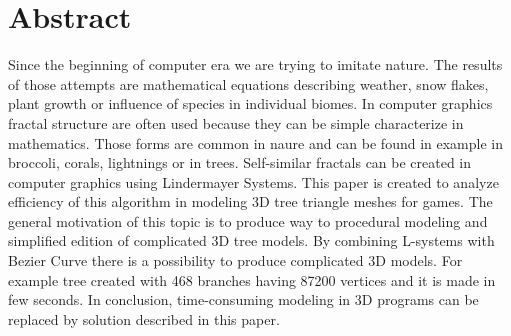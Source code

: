 \documentclass[12pt]{report}
\begin{document}
\begin{sloppypar}
\begin{thebibliography}{99}
\end{thebibliography}

\listoffigures

\lstlistoflistings

\listofmyequations
{} 

\chapter*{Abstract}
Since the beginning of computer era we are trying to imitate nature. The results of those attempts are mathematical equations describing weather, snow flakes, plant growth or influence of species in individual biomes. In computer graphics fractal structure are often used because they can be simple characterize in mathematics. Those forms are common in naure and can be found in example in broccoli, corals, lightnings or in trees. 
Self-similar fractals can be created in computer graphics using Lindermayer Systems. This paper is created to analyze efficiency of this algorithm in modeling 3D tree triangle meshes for games. The general motivation of this topic is to produce way to procedural modeling and simplified edition of complicated 3D tree models. By combining L-systems with Bezier Curve there is a possibility to produce complicated 3D models. For example tree created with 468 branches having 87200 vertices and it is made in few seconds. In conclusion, time-consuming modeling in 3D programs can be replaced by solution described in this paper. 
 


\end{sloppypar}
\end{document}
